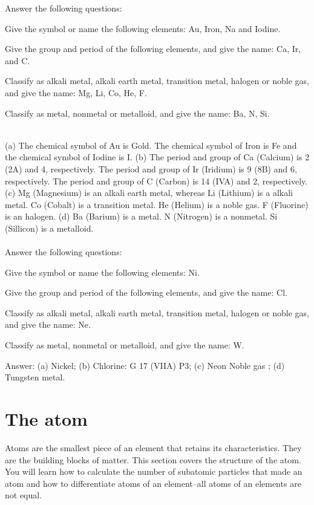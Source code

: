 \documentclass[main.tex]{subfiles}
\begin{document}
\begin{example} %
Answer the following questions:
\begin{inparaenum}[(a)]
\item Give the symbol or name the following elements: Au, Iron, Na and Iodine.
\item Give the group and period of the following elements, and give the name: Ca, Ir, and C.
\item Classify as alkali metal, alkali earth metal, transition metal, halogen or noble gas, and give the name: Mg, Li, Co, He, F.
\item Classify as metal, nonmetal or metalloid, and give the name: Ba, N, Si.
\end{inparaenum}
\\
(a) The chemical symbol of Au is Gold. The chemical symbol of Iron is Fe and the chemical symbol of Iodine is I. (b) The period and group of Ca (Calcium) is 2 (2A) and 4, respectively. The period and group of Ir (Iridium) is 9 (8B) and 6, respectively. The period and group of C (Carbon) is 14 (IVA) and 2, respectively. (c) Mg (Magnesium) is an alkali earth metal, whereas Li (Lithium) is a alkali  metal. Co (Cobalt) is a transition metal. He (Helium) is a noble gas. F (Fluorine) is an halogen. (d) Ba (Barium) is a metal. N (Nitrogen) is a nonmetal. Si (Sillicon) is a metalloid.\\
\faDiamond\ \\
Answer the following questions:
\begin{inparaenum}[(a)]
\item Give the symbol or name the following elements: Ni.
\item Give the group and period of the following elements, and give the name: Cl.
\item Classify as alkali metal, alkali earth metal, transition metal, halogen or noble gas, and give the name: Ne.
\item Classify as metal, nonmetal or metalloid, and give the name: W.
\end{inparaenum}
\flushright Answer: (a) Nickel; (b) Chlorine: G 17 (VIIA)  P3; (c) Neon Noble gas ; (d) Tungsten metal.
\end{example}%

\section{The atom}
Atoms are the smallest piece of an element that retains its characteristics. They are the building blocks of matter. This section covers the structure of the atom. You will learn how to calculate the number of subatomic particles that made an atom and how to differentiate atoms of an element--all atoms of an elements are not equal.
\end{document}

